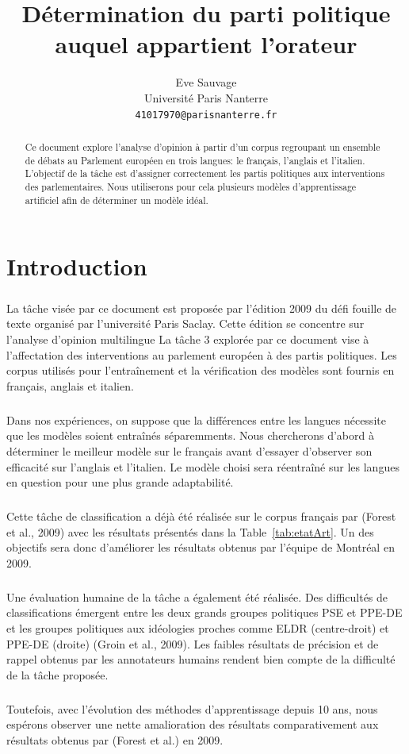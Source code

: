 \documentclass[11pt]{article}
\title{Détermination du parti politique auquel appartient l’orateur}
\author{Eve Sauvage \\
  Université Paris Nanterre \\
  \texttt{41017970@parisnanterre.fr}}
\begin{document}
\maketitle
\begin{abstract}
Ce document explore l'analyse d'opinion à partir d'un corpus regroupant un ensemble de débats au Parlement européen en trois langues: le français, l'anglais et l'italien. L'objectif de la tâche est d'assigner correctement les partis politiques aux interventions des parlementaires. Nous utiliserons pour cela plusieurs modèles d'apprentissage artificiel afin de déterminer un modèle idéal.
\end{abstract}

\section{Introduction}

\subparagraph{}
La tâche visée par ce document est proposée par l'édition 2009 du défi fouille de texte organisé par l'université Paris Saclay. Cette édition se concentre sur l'analyse d'opinion multilingue La tâche 3 explorée par ce document vise à l'affectation des interventions au parlement européen à des partis politiques. Les corpus utilisés pour l'entraînement et la vérification des modèles sont fournis en français, anglais et italien.
\subparagraph{}
Dans nos expériences, on suppose que la différences entre les langues nécessite que les modèles soient entraînés séparemments. Nous chercherons d'abord à déterminer le meilleur modèle sur le français avant d'essayer d'observer son efficacité sur l'anglais et l'italien. Le modèle choisi sera réentraîné sur les langues en question pour une plus grande adaptabilité.
\subparagraph{}
Cette tâche de classification a déjà été réalisée sur le corpus français par (Forest et al., 2009) avec les résultats présentés dans la Table~\ref{tab:etatArt}. Un des objectifs sera donc d'améliorer les résultats obtenus par l'équipe de Montréal en 2009.
\subparagraph{}
Une évaluation humaine de la tâche a également été réalisée. Des difficultés de classifications émergent entre les deux grands groupes politiques PSE et PPE-DE et les groupes politiques aux idéologies proches comme ELDR (centre-droit) et PPE-DE (droite) (Groin et al., 2009). Les faibles résultats de précision et de rappel obtenus par les annotateurs humains rendent bien compte de la difficulté de la tâche proposée.
\subparagraph{}
Toutefois, avec l'évolution des méthodes d'apprentissage depuis 10 ans, nous espérons observer une nette amalioration des résultats comparativement aux résultats obtenus par (Forest et al.) en 2009.
\end{document}
